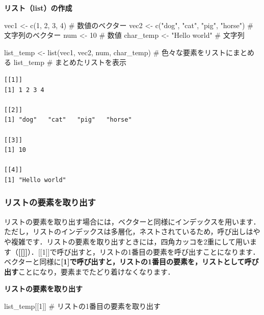\documentclass[
  letterpaper,
  DIV=11,
  numbers=noendperiod]{scrreprt}
\newenvironment{Shaded}{\begin{snugshade}}{\end{snugshade}}
\newcommand{\CommentTok}[1]{\textcolor[rgb]{0.37,0.37,0.37}{#1}}
\newcommand{\DecValTok}[1]{\textcolor[rgb]{0.68,0.00,0.00}{#1}}
\newcommand{\FunctionTok}[1]{\textcolor[rgb]{0.28,0.35,0.67}{#1}}
\newcommand{\NormalTok}[1]{\textcolor[rgb]{0.00,0.23,0.31}{#1}}
\newcommand{\OtherTok}[1]{\textcolor[rgb]{0.00,0.23,0.31}{#1}}
\newcommand{\StringTok}[1]{\textcolor[rgb]{0.13,0.47,0.30}{#1}}
\begin{document}
\textbf{リスト（list）の作成}

\begin{Shaded}
\begin{Highlighting}[]
\NormalTok{vec1 }\OtherTok{\textless{}{-}} \FunctionTok{c}\NormalTok{(}\DecValTok{1}\NormalTok{, }\DecValTok{2}\NormalTok{, }\DecValTok{3}\NormalTok{, }\DecValTok{4}\NormalTok{) }\CommentTok{\# 数値のベクター}
\NormalTok{vec2 }\OtherTok{\textless{}{-}} \FunctionTok{c}\NormalTok{(}\StringTok{"dog"}\NormalTok{, }\StringTok{"cat"}\NormalTok{, }\StringTok{"pig"}\NormalTok{, }\StringTok{"horse"}\NormalTok{) }\CommentTok{\# 文字列のベクター}
\NormalTok{num }\OtherTok{\textless{}{-}} \DecValTok{10} \CommentTok{\# 数値}
\NormalTok{char\_temp }\OtherTok{\textless{}{-}} \StringTok{"Hello world"} \CommentTok{\# 文字列}

\NormalTok{list\_temp }\OtherTok{\textless{}{-}} \FunctionTok{list}\NormalTok{(vec1, vec2, num, char\_temp) }\CommentTok{\# 色々な要素をリストにまとめる}
\NormalTok{list\_temp }\CommentTok{\# まとめたリストを表示}
\end{Highlighting}
\end{Shaded}

\begin{verbatim}
[[1]]
[1] 1 2 3 4

[[2]]
[1] "dog"   "cat"   "pig"   "horse"

[[3]]
[1] 10

[[4]]
[1] "Hello world"
\end{verbatim}

\hypertarget{ux30eaux30b9ux30c8ux306eux8981ux7d20ux3092ux53d6ux308aux51faux3059}{%
\subsubsection{リストの要素を取り出す}\label{ux30eaux30b9ux30c8ux306eux8981ux7d20ux3092ux53d6ux308aux51faux3059}}

リストの要素を取り出す場合には，ベクターと同様にインデックスを用います．ただし，リストのインデックスは多層化，ネストされているため，呼び出しはやや複雑です．リストの要素を取り出すときには，四角カッコを2重にして用います（\textbf{{[}{[}{]}{]}}）．{[}{[}1{]}{]}で呼び出すと，リストの1番目の要素を呼び出すことになります．ベクターと同様に\textbf{{[}1{]}で呼び出すと，リストの1番目の要素を，リストとして呼び出す}ことになり，要素までたどり着けなくなります．

\textbf{リストの要素を取り出す}

\begin{Shaded}
\begin{Highlighting}[]
\NormalTok{list\_temp[[}\DecValTok{1}\NormalTok{]] }\CommentTok{\# リストの1番目の要素を取り出す}
\end{Highlighting}
\end{Shaded}
\end{document}
